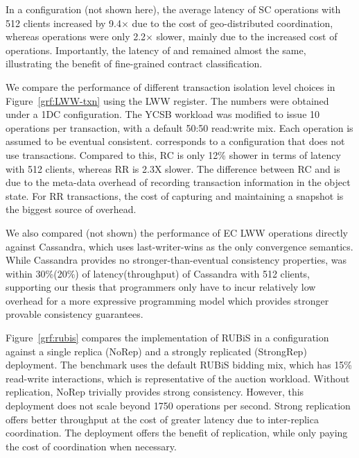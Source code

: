 In a  configuration (not shown here), the average latency of SC
operations with 512 clients increased by 9.4$\times$ due to the cost of
geo-distributed coordination, whereas \name operations were only 2.2$\times$
slower, mainly due to the increased cost of 
operations. Importantly, the latency of  and 
remained almost the same, illustrating the benefit of fine-grained
contract classification.

We compare the performance of different transaction isolation level choices
in Figure~\ref{grf:LWW-txn} using the LWW register. The numbers were
obtained under a 1DC configuration. The YCSB workload was modified to issue
10 operations per transaction, with a default 50:50 read:write mix. Each
operation is assumed to be eventual consistent.  corresponds to a
configuration that does not use transactions. Compared to this, RC is only
12\% shower in terms of latency with 512 clients, whereas RR is 2.3X
slower. The difference between RC and  is due to the meta-data
overhead of recording transaction information in the object state. For RR
transactions, the cost of capturing and maintaining a snapshot is the
biggest source of overhead.

We also compared (not shown) the performance of EC LWW operations directly
against Cassandra, which uses last-writer-wins as the only convergence
semantics. While Cassandra provides no stronger-than-eventual consistency
properties, \name was within 30\%(20\%) of latency(throughput) of Cassandra
with 512 clients, supporting our thesis that programmers only have to incur
relatively low overhead for a more expressive programming model which
provides stronger provable consistency guarantees.

Figure~\ref{grf:rubis} compares the \name implementation of RUBiS in a
 configuration against a single replica ({\sf\small NoRep}) and a strongly
replicated ({\sf\small StrongRep})  deployment. The benchmark uses the
default RUBiS bidding mix, which has 15\% read-write interactions, which is
representative of the auction workload.  Without replication, {\sf\small NoRep}
trivially provides strong consistency. However, this deployment does not
scale beyond 1750 operations per second. Strong replication offers better
throughput at the cost of greater latency due to inter-replica
coordination. The \name deployment offers the benefit of replication, while
only paying the cost of coordination when necessary.

